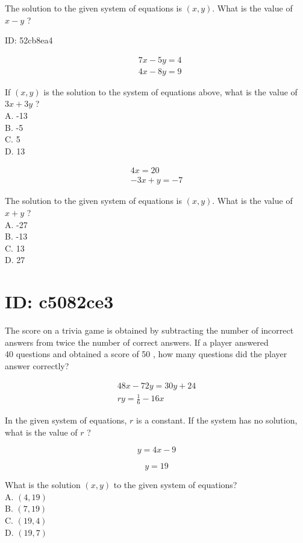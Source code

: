 The solution to the given system of equations is $(x, y)$. What is the value of $x-y$ ?

ID: 52cb8ea4

$$
\begin{aligned}
& 7 x-5 y=4 \\
& 4 x-8 y=9
\end{aligned}
$$

If $(x, y)$ is the solution to the system of equations above, what is the value of $3 x+3 y$ ?\\
A. -13\\
B. -5\\
C. 5\\
D. 13

$$
\begin{gathered}
4 x=20 \\
-3 x+y=-7
\end{gathered}
$$

The solution to the given system of equations is $(x, y)$. What is the value of $x+y$ ?\\
A. -27\\
B. -13\\
C. 13\\
D. 27

\section*{ID: c5082ce3}
The score on a trivia game is obtained by subtracting the number of incorrect answers from twice the number of correct answers. If a player answered\\
40 questions and obtained a score of 50 , how many questions did the player answer correctly?

$$
\begin{gathered}
48 x-72 y=30 y+24 \\
r y=\frac{1}{6}-16 x
\end{gathered}
$$

In the given system of equations, $r$ is a constant. If the system has no solution, what is the value of $r$ ?

$$
y=4 x-9
$$

$$
y=19
$$

What is the solution $(x, y)$ to the given system of equations?\\
A. $(4,19)$\\
B. $(7,19)$\\
C. $(19,4)$\\
D. $(19,7)$

